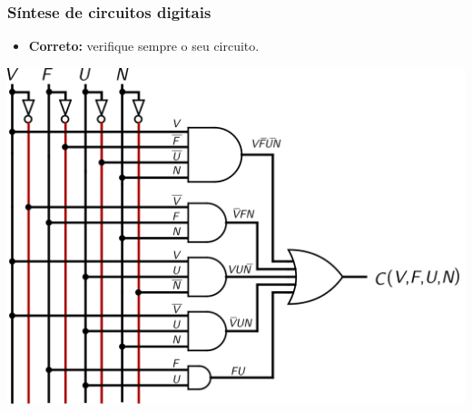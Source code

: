 \documentclass{beamer}
\begin{document}
\begin{frame}
\frametitle{Síntese de circuitos digitais}

\begin{itemize}
\item \textbf{Correto: } verifique sempre o seu circuito.
\end{itemize}

\begin{center}
\includegraphics[height=35ex]{images/exemplo2_econ}
\end{center}

\end{frame}

\end{document}
